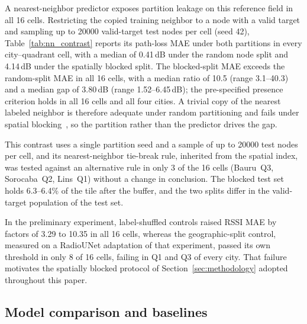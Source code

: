 \documentclass{ieeeaccess}
\begin{document}
A nearest-neighbor predictor exposes partition leakage on this reference field in all 16 cells. Restricting the copied training neighbor to a node with a valid target and sampling up to \num{20000} valid-target test nodes per cell (seed 42), Table~\ref{tab:nn_contrast} reports its path-loss MAE under both partitions in every city--quadrant cell, with a median of 0.41\,dB under the random node split and 4.14\,dB under the spatially blocked split. The blocked-split MAE exceeds the random-split MAE in all 16 cells, with a median ratio of 10.5 (range 3.1--40.3) and a median gap of 3.80\,dB (range 1.52--6.45\,dB); the pre-specified presence criterion holds in all 16 cells and all four cities. A trivial copy of the nearest labeled neighbor is therefore adequate under random partitioning and fails under spatial blocking~\cite{ploton2020spatial}, so the partition rather than the predictor drives the gap.



This contrast uses a single partition seed and a sample of up to \num{20000} test nodes per cell, and its nearest-neighbor tie-break rule, inherited from the spatial index, was tested against an alternative rule in only 3 of the 16 cells (Bauru~Q3, Sorocaba~Q2, Lins~Q1) without a change in conclusion. The blocked test set holds 6.3--6.4\% of the tile after the buffer, and the two splits differ in the valid-target population of the test set.

In the preliminary experiment, label-shuffled controls raised RSSI MAE by factors of 3.29 to 10.35 in all 16 cells, whereas the geographic-split control, measured on a RadioUNet adaptation of that experiment, passed its own threshold in only 8 of 16 cells, failing in Q1 and Q3 of every city. That failure motivates the spatially blocked protocol of Section~\ref{sec:methodology} adopted throughout this paper.

\subsection{Model comparison and baselines}
\label{sec:model_comparison}
\end{document}
